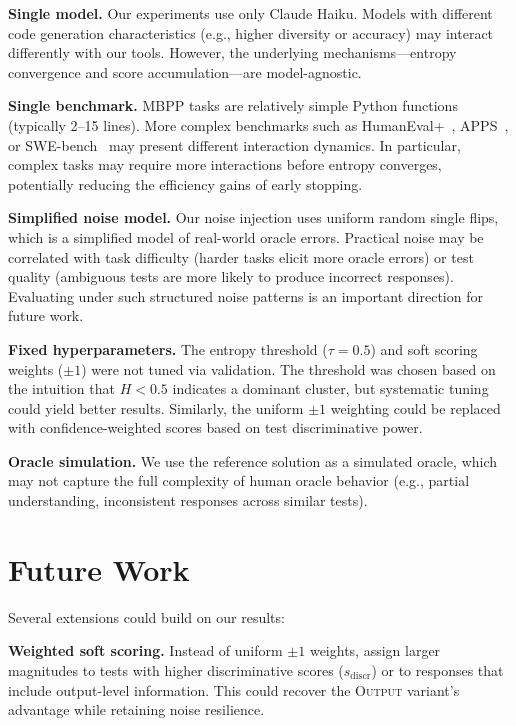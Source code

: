\documentclass[conference]{IEEEtran}
\begin{document}
\textbf{Single model.} Our experiments use only Claude Haiku. Models with different code generation characteristics (e.g., higher diversity or accuracy) may interact differently with our tools. However, the underlying mechanisms---entropy convergence and score accumulation---are model-agnostic.

\textbf{Single benchmark.} MBPP tasks are relatively simple Python functions (typically 2--15 lines). More complex benchmarks such as HumanEval+~\cite{liu2023humaneval}, APPS~\cite{hendrycks2021apps}, or SWE-bench~\cite{jimenez2024swebench} may present different interaction dynamics. In particular, complex tasks may require more interactions before entropy converges, potentially reducing the efficiency gains of early stopping.

\textbf{Simplified noise model.} Our noise injection uses uniform random single flips, which is a simplified model of real-world oracle errors. Practical noise may be correlated with task difficulty (harder tasks elicit more oracle errors) or test quality (ambiguous tests are more likely to produce incorrect responses). Evaluating under such structured noise patterns is an important direction for future work.

\textbf{Fixed hyperparameters.} The entropy threshold ($\tau = 0.5$) and soft scoring weights ($\pm 1$) were not tuned via validation. The threshold was chosen based on the intuition that $H < 0.5$ indicates a dominant cluster, but systematic tuning could yield better results. Similarly, the uniform $\pm 1$ weighting could be replaced with confidence-weighted scores based on test discriminative power.

\textbf{Oracle simulation.} We use the reference solution as a simulated oracle, which may not capture the full complexity of human oracle behavior (e.g., partial understanding, inconsistent responses across similar tests).

\section{Future Work}

Several extensions could build on our results:

\textbf{Weighted soft scoring.} Instead of uniform $\pm 1$ weights, assign larger magnitudes to tests with higher discriminative scores ($s_{\text{discr}}$) or to responses that include output-level information. This could recover the \textsc{Output} variant's advantage while retaining noise resilience.
\end{document}
